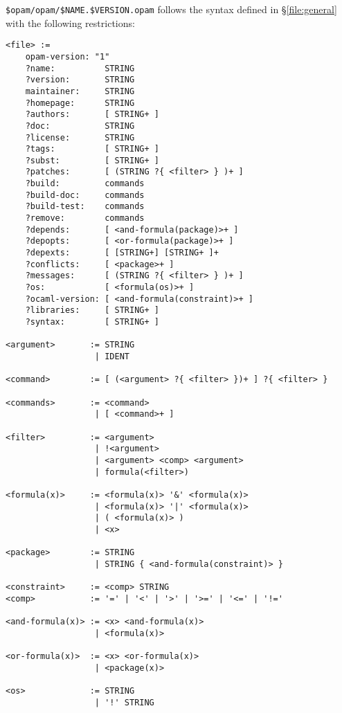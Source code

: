 \documentclass[a4paper,11pt]{article}
\begin{document}
\verb+$opam/opam/$NAME.$VERSION.opam+ follows the syntax defined in
\S\ref{file:general} with the following restrictions:

{\small
\begin{Verbatim}[frame=single]
<file> :=
    opam-version: "1"
    ?name:          STRING
    ?version:       STRING
    maintainer:     STRING
    ?homepage:      STRING
    ?authors:       [ STRING+ ]
    ?doc:           STRING
    ?license:       STRING
    ?tags:          [ STRING+ ]
    ?subst:         [ STRING+ ]
    ?patches:       [ (STRING ?{ <filter> } )+ ]
    ?build:         commands
    ?build-doc:     commands
    ?build-test:    commands
    ?remove:        commands
    ?depends:       [ <and-formula(package)>+ ]
    ?depopts:       [ <or-formula(package)>+ ]
    ?depexts:       [ [STRING+] [STRING+ ]+
    ?conflicts:     [ <package>+ ]
    ?messages:      [ (STRING ?{ <filter> } )+ ]
    ?os:            [ <formula(os)>+ ]
    ?ocaml-version: [ <and-formula(constraint)>+ ]
    ?libraries:     [ STRING+ ]
    ?syntax:        [ STRING+ ]

<argument>       := STRING
                  | IDENT

<command>        := [ (<argument> ?{ <filter> })+ ] ?{ <filter> }

<commands>       := <command>
                  | [ <command>+ ]

<filter>         := <argument>
                  | !<argument>
                  | <argument> <comp> <argument>
                  | formula(<filter>)

<formula(x)>     := <formula(x)> '&' <formula(x)>
                  | <formula(x)> '|' <formula(x)>
                  | ( <formula(x)> )
                  | <x>

<package>        := STRING
                  | STRING { <and-formula(constraint)> }

<constraint>     := <comp> STRING
<comp>           := '=' | '<' | '>' | '>=' | '<=' | '!='

<and-formula(x)> := <x> <and-formula(x)>
                  | <formula(x)>

<or-formula(x)>  := <x> <or-formula(x)>
                  | <package(x)>

<os>             := STRING
                  | '!' STRING
\end{Verbatim}
}
\end{document}
